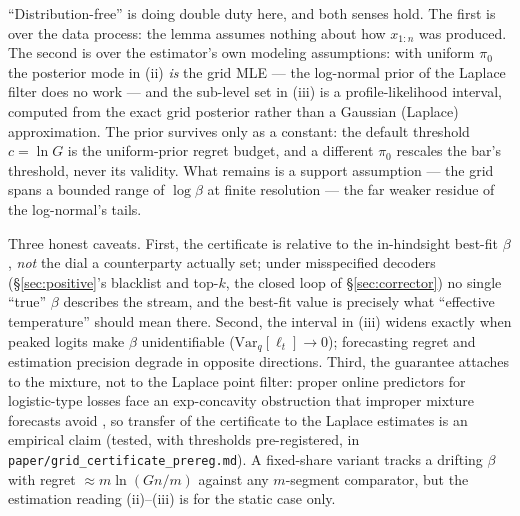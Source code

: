 \documentclass[11pt]{article}
\newcommand{\tabdir}{../results/tables}
\begin{document}
``Distribution-free'' is doing double duty here, and both senses hold. The
first is over the data process: the lemma assumes nothing about how $x_{1:n}$
was produced. The second is over the estimator's own modeling assumptions:
with uniform $\pi_0$ the posterior mode in (ii) \emph{is} the grid MLE --- the
log-normal prior of the Laplace filter does no work --- and the sub-level set
in (iii) is a profile-likelihood interval, computed from the exact grid
posterior rather than a Gaussian (Laplace) approximation. The prior survives
only as a constant: the default threshold $c = \ln G$ is the uniform-prior
regret budget, and a different $\pi_0$ rescales the bar's threshold, never its
validity. What remains is a support assumption --- the grid spans a bounded
range of $\log\beta$ at finite resolution --- the far weaker residue of the
log-normal's tails.

Three honest caveats. First, the certificate is relative to the in-hindsight
best-fit $\beta$, \emph{not} the dial a counterparty actually set; under
misspecified decoders (\S\ref{sec:positive}'s blacklist and top-$k$, the
closed loop of \S\ref{sec:corrector}) no single ``true'' $\beta$ describes
the stream, and the best-fit value is precisely what ``effective
temperature'' should mean there. Second, the interval in (iii) widens
exactly when peaked logits make $\beta$ unidentifiable
($\mathrm{Var}_{q}[\ell_t] \to 0$); forecasting regret and estimation
precision degrade in opposite directions. Third, the guarantee attaches to
the mixture, not to the Laplace point filter: proper online predictors for
logistic-type losses face an exp-concavity obstruction that improper mixture
forecasts avoid \citep{foster2018logistic}, so transfer of the certificate
to the Laplace estimates is an empirical claim (tested, with thresholds
pre-registered, in \texttt{paper/grid\_certificate\_prereg.md}). A
fixed-share variant \citep{herbster1998tracking} tracks a drifting $\beta$
with regret $\approx m\ln(Gn/m)$ against any $m$-segment comparator, but
the estimation reading (ii)--(iii) is for the static case only.

\begin{table}[t]
\centering

\caption{Pre-registered evaluation of the certificate
(\texttt{paper/grid\_certificate\_prereg.md}; hypotheses, sample sizes, and
thresholds committed before any data were generated). Bars use the default
threshold $c=\ln G$ on a $121$-point grid spanning $\log\beta \in [-3,3]$;
real streams are Qwen-2.5-3B, $32$ prompts, $1000$ tokens.}
\label{tab:grid_certificate}
\end{table}
\end{document}
